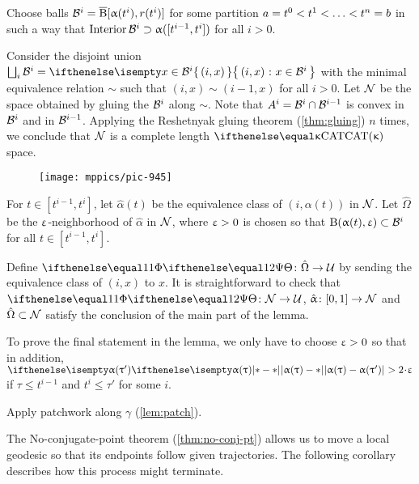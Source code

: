 Choose balls $\mathcal{B}^i=\overline{\mathrm{B}}{}[\upalpha(t^i),r(t^i)]$
for some partition $a\z=t^0<t^1\z<\z\dots\z<t^n\z=b$
in such a way that 
$\Int\spc{B}^i\supset \alpha([t^{i-1},t^i])$ for all $i>0$.

Consider the disjoint union $\bigsqcup_i\spc{B}^i=\set{(i,x)}{x\in\spc{B}^i}$ with the minimal equivalence relation $\sim$ such that $(i,x)\sim(i-1,x)$ for all $i>0$.
Let  $\mathcal{N}$ be the space obtained by gluing the $\mathcal{B}^i$ along $\sim$.
Note that $A^i=\spc{B}^i\cap\spc{B}^{i-1}$ is convex in $\mathcal{B}^i$ and in $\mathcal{B}^{i-1}$.
Applying the Reshetnyak gluing theorem (\ref{thm:gluing}) $n$ times, 
we conclude that $\mathcal{N}$ is a complete length $\CAT\kappa$ space.

\begin{figure}[!ht]
\vskip-0mm
\centering
\texttt{[image: mppics/pic-945]}
\end{figure}

For $t\in[t^{i-1},t^i]$, let $\hat\alpha(t)$  be the equivalence class of $(i,\alpha(t))$ in $\mathcal{N}$.
Let $\hat\Omega$ be the $\upvarepsilon$-neighborhood of $\hat\alpha$ in $\mathcal{N}$, where $\upvarepsilon>0$ is chosen so that $\oBall(\alpha(t),\eps)\subset\spc{B}^i$ for all $t\in[t^{i-1},t^i]$.

Define $\map\:\hat\Omega\to\spc{U}$
by sending the equivalence class of $(i,x)$ to $x$.
It is straightforward to check that $\map\:\spc{N}\to\spc{U}$, $\hat\alpha\:[0,1]\to\spc{N}$ and $\hat\Omega\subset\spc{N}$ satisfy the conclusion of the main part of the lemma.

To prove the final statement in the lemma,
we only have to choose $\upvarepsilon>0$ so that in addition, $\dist{\alpha(\tau)}{\alpha(\tau')}{}>2\cdot\eps$ if $\tau\le t^{i-1}$ and $t^i\le\tau'$ for some $i$.
\qeds


Apply patchwork along $\gamma$ (\ref{lem:patch}). 
\qeds



The No-conjugate-point theorem (\ref{thm:no-conj-pt}) allows us to move a local geodesic  
so that its endpoints follow given trajectories.
The following corollary describes how this process might terminate. 


